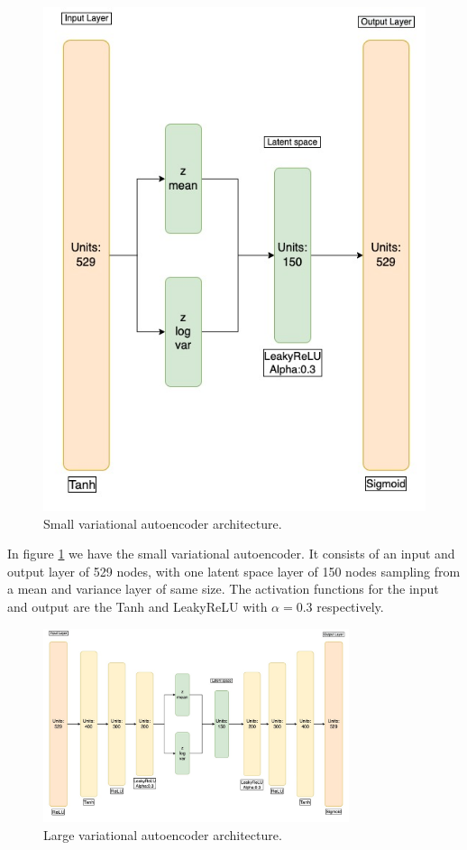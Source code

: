 \begin{figure}[h!]
    \centering
    \includegraphics[scale=0.5]{Figures/nnarchitect/vae_small.jpeg}
    \caption{Small variational autoencoder architecture.}
    \label{fig:vae_small}
\end{figure}

In figure \ref{fig:vae_small} we have the small variational autoencoder. It consists of an input and output layer of 529 nodes, with 
one latent space layer of 150 nodes sampling from a mean and variance layer of same size. The activation functions for the input and 
output are the Tanh and LeakyReLU with $\alpha=0.3$ respectively.

\begin{figure}[h!]
    \centering
    \includegraphics[width=0.8\textwidth]{Figures/nnarchitect/vae_big.jpeg}
    \caption{Large variational autoencoder architecture.}
    \label{fig:vae_big}
\end{figure}


